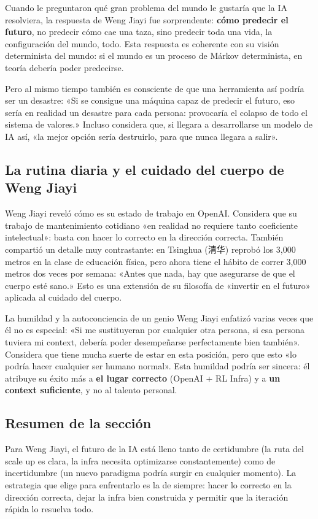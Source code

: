 Cuando le preguntaron qué gran problema del mundo le gustaría que la IA resolviera, la respuesta de Weng Jiayi fue sorprendente: \textbf{cómo predecir el futuro}, no predecir cómo cae una taza, sino predecir toda una vida, la configuración del mundo, todo. Esta respuesta es coherente con su visión determinista del mundo: si el mundo es un proceso de Márkov determinista, en teoría debería poder predecirse.

Pero al mismo tiempo también es consciente de que una herramienta así podría ser un desastre: «Si se consigue una máquina capaz de predecir el futuro, eso sería en realidad un desastre para cada persona: provocaría el colapso de todo el sistema de valores.» Incluso considera que, si llegara a desarrollarse un modelo de IA así, «la mejor opción sería destruirlo, para que nunca llegara a salir».

\subsection{La rutina diaria y el cuidado del cuerpo de Weng Jiayi}

Weng Jiayi reveló cómo es su estado de trabajo en OpenAI. Considera que su trabajo de mantenimiento cotidiano «en realidad no requiere tanto coeficiente intelectual»: basta con hacer lo correcto en la dirección correcta. También compartió un detalle muy contrastante: en Tsinghua (清华) reprobó los 3,000 metros en la clase de educación física, pero ahora tiene el hábito de correr 3,000 metros dos veces por semana: «Antes que nada, hay que asegurarse de que el cuerpo esté sano.» Esto es una extensión de su filosofía de «invertir en el futuro» aplicada al cuidado del cuerpo.

\begin{warningbox}{La humildad y la autoconciencia de un genio}
Weng Jiayi enfatizó varias veces que él no es especial: «Si me sustituyeran por cualquier otra persona, si esa persona tuviera mi context, debería poder desempeñarse perfectamente bien también». Considera que tiene mucha suerte de estar en esta posición, pero que esto «lo podría hacer cualquier ser humano normal». Esta humildad podría ser sincera: él atribuye su éxito más a \textbf{el lugar correcto} (OpenAI + RL Infra) y a \textbf{un context suficiente}, y no al talento personal.
\end{warningbox}

\subsection{Resumen de la sección}

Para Weng Jiayi, el futuro de la IA está lleno tanto de certidumbre (la ruta del scale up es clara, la infra necesita optimizarse constantemente) como de incertidumbre (un nuevo paradigma podría surgir en cualquier momento). La estrategia que elige para enfrentarlo es la de siempre: hacer lo correcto en la dirección correcta, dejar la infra bien construida y permitir que la iteración rápida lo resuelva todo.

